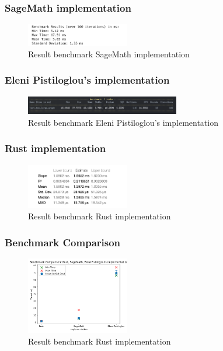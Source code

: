 \subsubsection*{SageMath implementation}
\begin{figure}[!h]
    \centering
    \includegraphics[width=0.40\textwidth]{images/benchmark/graph_100_970/benchmark_graph_100_970_sagemath}
    \caption{Result benchmark SageMath implementation}
    \label{fig:benchmark-graph-100-970-sagemath}
\end{figure}

\subsubsection*{Eleni Pistiloglou's implementation}
\begin{figure}[!h]
    \centering
    \includegraphics[width=0.60\textwidth]{images/benchmark/graph_100_970/benchmark_graph_100_970_python}
    \caption{Result benchmark Eleni Pistiloglou's implementation}
    \label{fig:benchmark-graph-100-970-python}
\end{figure}

\subsubsection*{Rust implementation}
\begin{figure}[!h]
    \centering
    \includegraphics[width=0.40\textwidth]{images/benchmark/graph_100_970/benchmark_graph_100_970_rust}
    \caption{Result benchmark Rust implementation}
    \label{fig:benchmark-graph-100-970-rust}
\end{figure}

\subsubsection*{Benchmark Comparison}
\begin{figure}[!h]
    \centering
    \includegraphics[width=0.40\textwidth]{images/benchmark/graph_100_970/benchmark_comparison_graph_100_970}
    \caption{Result benchmark Rust implementation}
    \label{fig:benchmark-comparison-graph-100-970}
\end{figure}


